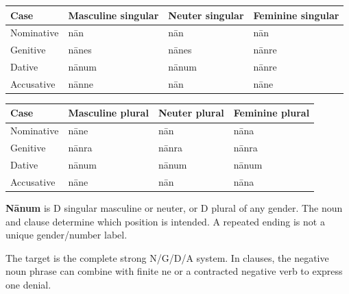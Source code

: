 \begin{minipage}{\linewidth}
\par\begingroup
\fontsize{10.5}{13.2}\selectfont
\setlength{\LTleft}{0pt}\setlength{\LTright}{\fill}
\noindent
\begin{tabular}{@{}>{\raggedright\arraybackslash}p{22.0mm}>{\raggedright\arraybackslash}p{31.188mm}>{\raggedright\arraybackslash}p{31.188mm}>{\raggedright\arraybackslash}p{31.188mm}@{}}
\toprule
\textbf{Case} & \textbf{Masculine singular} & \textbf{Neuter singular} & \textbf{Feminine singular} \\
\midrule
Nominative & nān & nān & nān \\
Genitive & nānes & nānes & nānre \\
Dative & nānum & nānum & nānre \\
Accusative & nānne & nān & nāne \\
\bottomrule
\end{tabular}
\par\endgroup
\par\addvspace{5pt}
\par\begingroup
\fontsize{10.5}{13.2}\selectfont
\setlength{\LTleft}{0pt}\setlength{\LTright}{\fill}
\noindent
\begin{tabular}{@{}>{\raggedright\arraybackslash}p{22.0mm}>{\raggedright\arraybackslash}p{31.188mm}>{\raggedright\arraybackslash}p{31.188mm}>{\raggedright\arraybackslash}p{31.188mm}@{}}
\toprule
\textbf{Case} & \textbf{Masculine plural} & \textbf{Neuter plural} & \textbf{Feminine plural} \\
\midrule
Nominative & nāne & nān & nāna \\
Genitive & nānra & nānra & nānra \\
Dative & nānum & nānum & nānum \\
Accusative & nāne & nān & nāna \\
\bottomrule
\end{tabular}
\par\endgroup

\textbf{Nānum} is D singular masculine or neuter, or D plural of any gender. The noun and clause determine which position is intended. A repeated ending is not a unique gender/\allowbreak{}number label.

The target is the complete strong N/\allowbreak{}G/\allowbreak{}D/\allowbreak{}A system. In clauses, the negative noun phrase can combine with finite ne or a contracted negative verb to express one denial.

\end{minipage}\par\addvspace{4pt}

